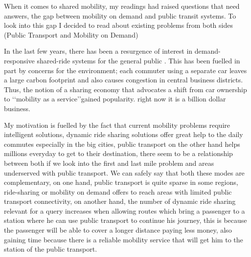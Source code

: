 \documentclass{article}
\begin{document}


When it comes to shared mobility, my readings had raised questions that need answers, the gap between mobility on demand and public transit systems. To look into this gap I decided to read about existing problems from both sides (Public Transport and Mobility on Demand)

In the last few years, there has been a resurgence of interest in demand-responsive shared-ride systems for the general public \cite{HO_darp2018}. This has been fuelled in part by concerns for the environment; each commuter using a separate car leaves a large carbon footprint and also causes congestion in central business districts. Thus, the notion of a sharing economy that advocates a shift from car ownership to \lq\lq{mobility as a service}\rq\rq gained popularity. right now it is a billion dollar business. 

My motivation is fuelled by the fact that current mobility problems require intelligent solutions, dynamic ride sharing solutions offer great help to the daily commutes especially in the big cities, public transport on the other hand helps millions everyday to get to their destination,
there seem to be a relationship between both if we look into the first and last mile problem and areas underserved with public transport. We can safely say that both these modes are complementary, on one hand, public transport is quite sparse in some regions, ride-sharing or mobility on demand offers to reach areas with limited public transport connectivity, on another hand, the number of dynamic ride sharing relevant for a query increases when allowing routes which bring a passenger to a station where he can use public transport to continue 
his journey, this is because the passenger will be able to cover a longer distance paying less money, also gaining time because there is a reliable mobility service that will get him to the station of the public transport. \cite{FAHNENSCHREIBER2016176}
\end{document}
